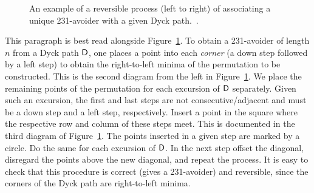 \documentclass[12pt, a4paper, twoside]{report}
\begin{document}
\begin{figure}[!ht]
\begin{center}
\caption{\small{An example of a reversible process (left to right) of associating a unique 231-avoider with a given Dyck path.~\cite{albert-new}.}}
\label{fig:bij231dyck}
\end{center}
\end{figure}

This paragraph is best read alongside Figure~\ref{fig:bij231dyck}. To obtain a 231-avoider of length $n$ from a Dyck path $\textsf{D}$, one places a point into each \emph{corner} (a down step followed by a left step) to obtain the right-to-left minima of the permutation to be constructed. This is the second diagram from the left in Figure~\ref{fig:bij231dyck}.  We place the remaining points of the permutation for each excursion of $\textsf{D}$ separately. Given such an excursion, the first and last steps are not consecutive/adjacent and must be a down step and a left step, respectively. Insert a point in the square where the respective row and column of these steps meet. This is documented in the third diagram of Figure~\ref{fig:bij231dyck}. The points inserted in a given step are marked by a circle. Do the same for each excursion of $\textsf{D}$. In the next step offset the diagonal, disregard the points above the new diagonal, and repeat the process. It is easy to check that this procedure is correct (gives a 231-avoider) and reversible, since the corners of the Dyck path are right-to-left minima.
\end{document}
